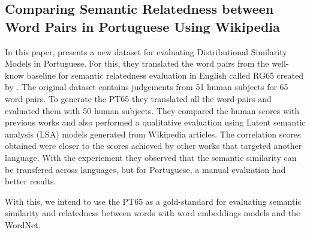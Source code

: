 \subsection{Comparing Semantic Relatedness between Word Pairs in Portuguese Using Wikipedia}

In this paper,  presents a new dataset for evaluating Distributional Similarity Models in Portuguese. For this, they translated the word pairs from the well-know baseline for semantic relatedness evaluation in English called RG65 created by . The original dataset contains judgements from 51 human subjects for 65 word pairs. To generate the PT65 they translated all the word-pairs and evaluated them with 50 human subjects. They compared the human scores with previous works and also performed a qualitative evaluation using Latent semantic analysis (LSA) models generated from Wikipedia articles. The correlation scores obtained were closer to the scores achieved by other works that targeted another language. With the experiement they observed that the semantic similarity can be transfered across languages, but for Portuguese, a manual evaluation had better results. 

With this, we intend to use the PT65 as a gold-standard for evaluating semantic similarity and relatedness between words with word embeddings models and the WordNet.

 

